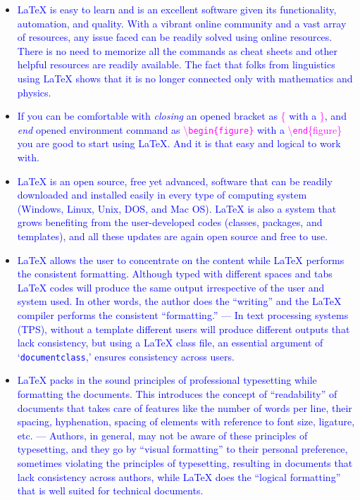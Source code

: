 \documentclass[phd,showgrids]{ndsu-thesis-2022}
\newcommand\italk[1]{\textcolor{blue}{#1}}  %
\newcommand\cmd[1]{\textbackslash\texttt{#1}}  %
\newcommand\lx{\LaTeX\xspace}
\newcommand\vb[1]{\textcolor{blue}{\texttt{#1}}}%
\begin{document}
\begin{itemize}[leftmargin=*, itemsep=0pt, parsep=3pt] 

\item \italk{\lx is easy to learn and is an excellent software given its functionality, automation, and quality. With a vibrant online community and a vast array of resources, any issue faced can be readily solved using online resources. There is no need to memorize all the commands as cheat sheets and other helpful resources are readily available. The fact that folks from linguistics using \lx shows that it is no longer connected only with mathematics and physics.} 

\item \italk{ If you can be comfortable with \emph{closing} an opened bracket as \textcolor{magenta}{\{} with a \textcolor{magenta}{\}}, and \emph{end} opened environment command as \textcolor{magenta}{\cmd{begin\{figure\}}} with a  \textcolor{magenta}{\cmd{end}\{figure\}} you are good to start using \lx. And it is that easy and logical to work with.}

\item \italk{\lx is an open source, free yet advanced, software that can be readily downloaded and installed easily in every type of computing system (Windows, Linux, Unix, DOS, and Mac OS). \lx is also a system that grows benefiting from the user-developed codes (classes, packages, and templates), and all these updates are again open source and free to use.}  

\item \italk{\lx allows the user to concentrate on the content while \lx performs the consistent formatting. Although typed with different spaces and tabs \lx codes will produce the same output irrespective of the user and system used. In other words, the author does the ``writing'' and the \lx compiler performs the consistent ``formatting.'' --- In text processing systems (TPS), without a template different users will produce different outputs that lack consistency, but using a \lx class file, an essential argument of `\vb{documentclass},' ensures consistency across users.}  

\item \italk{\lx packs in the sound principles of professional typesetting while formatting the documents. This introduces the concept of ``readability'' of documents that takes care of features like the number of words per line, their spacing, hyphenation, spacing of elements with reference to font size, ligature, etc. --- Authors, in general, may not be aware of these principles of typesetting, and they go by ``visual formatting'' to their personal preference, sometimes violating the principles of typesetting, resulting in documents that lack consistency across authors, while \lx does the ``logical formatting'' that is well suited for technical documents.} 


\end{itemize}
\end{document}
